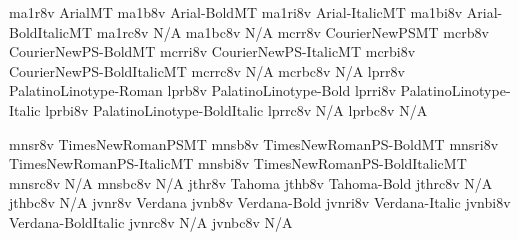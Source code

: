 \documentclass[test]{vnsample}
\begin{document}
\begin{shortsample}
  {ma1r8v}  {ArialMT}
  {ma1b8v}  {Arial-BoldMT}
 {ma1ri8v} {Arial-ItalicMT}
 {ma1bi8v} {Arial-BoldItalicMT}
 {ma1rc8v} {N/A}
 {ma1bc8v} {N/A}
  {mcrr8v}  {CourierNewPSMT}
  {mcrb8v}  {CourierNewPS-BoldMT}
 {mcrri8v} {CourierNewPS-ItalicMT}
 {mcrbi8v} {CourierNewPS-BoldItalicMT}
 {mcrrc8v} {N/A}
 {mcrbc8v} {N/A}
  {lprr8v}  {PalatinoLinotype-Roman}
  {lprb8v}  {PalatinoLinotype-Bold}
 {lprri8v} {PalatinoLinotype-Italic}
 {lprbi8v} {PalatinoLinotype-BoldItalic}
 {lprrc8v} {N/A}
 {lprbc8v} {N/A}
\end{shortsample}
\clearpage
\begin{shortsample}
  {mnsr8v}  {TimesNewRomanPSMT}
  {mnsb8v}  {TimesNewRomanPS-BoldMT}
 {mnsri8v} {TimesNewRomanPS-ItalicMT}
 {mnsbi8v} {TimesNewRomanPS-BoldItalicMT}
 {mnsrc8v} {N/A}
 {mnsbc8v} {N/A}
  {jthr8v}  {Tahoma}
  {jthb8v}  {Tahoma-Bold}
 {jthrc8v} {N/A}
 {jthbc8v} {N/A}
  {jvnr8v}  {Verdana}
  {jvnb8v}  {Verdana-Bold}
 {jvnri8v} {Verdana-Italic}
 {jvnbi8v} {Verdana-BoldItalic}
 {jvnrc8v} {N/A}
 {jvnbc8v} {N/A}
\end{shortsample}
\end{document}
